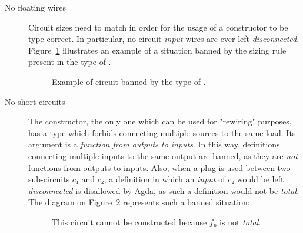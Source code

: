             \begin{description}
                \item[No floating wires] Circuit sizes need to match in order for the usage of a constructor
                    to be type-correct. In particular, no circuit \emph{input} wires are ever left \emph{disconnected}.
                    Figure~\ref{fig:sequencing-floating} illustrates an example of a situation banned by the sizing rule present
                    in the type of .

                    \begin{figure}[ht]
                        \caption{Example of circuit banned by the type of .\label{fig:sequencing-floating}}
                    \end{figure}

                \item [No short-circuits] The  constructor, the only one which can be used for
                    "rewiring" purposes, has a type which forbids connecting multiple sources to the same load.
                    Its argument is a \emph{function from outputs to inputs}.
                    In this way, definitions connecting multiple inputs to the same output are banned,
                    as they are \emph{not} functions from outputs to inputs.
                    Also, when a plug is used between two sub-circuits $c₁$ and $c₂$,
                    a definition in which an \emph{input} of $c₂$ would be left \emph{disconnected} is disallowed by Agda,
                    as such a definition would not be \emph{total}.
                    The diagram on Figure~\ref{fig:plug-seq-disconnected-input} represents such a banned situation:

                    \begin{figure}[ht]
                        \caption{This circuit cannot be constructed because $f_{p}$ is not \emph{total}.\label{fig:plug-seq-disconnected-input}}
                    \end{figure}
            \end{description}

